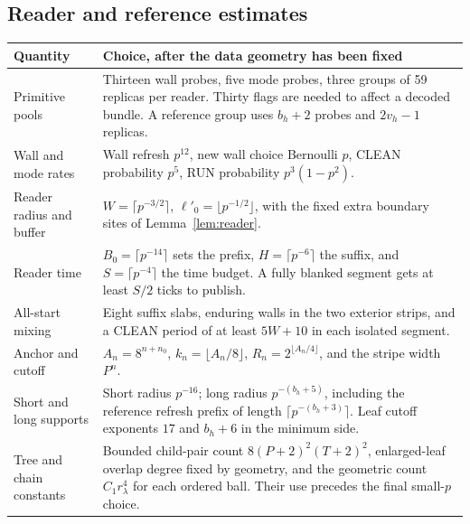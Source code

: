 \subsection{Reader and reference estimates}

\begin{longtable}{@{}>{\raggedright\arraybackslash}p{.29\linewidth}>{\raggedright\arraybackslash}p{.63\linewidth}@{}}
\toprule
Quantity & Choice, after the data geometry has been fixed \\
\midrule
\endhead
Primitive pools & Thirteen wall probes, five mode probes, three groups of 59 replicas per reader. Thirty flags are needed to affect a decoded bundle. A reference group uses \(b_h+2\) probes and \(2v_h-1\) replicas. \\
Wall and mode rates & Wall refresh \(p^{12}\), new wall choice Bernoulli \(p\), CLEAN probability \(p^5\), RUN probability \(p^3(1-p^2)\). \\
Reader radius and buffer & \(W=\lceil p^{-3/2}\rceil\), \(\ell'_0=\lfloor p^{-1/2}\rfloor\), with the fixed extra boundary sites of Lemma~\ref{lem:reader}. \\
Reader time & \(B_0=\lceil p^{-14}\rceil\) sets the prefix, \(H=\lceil p^{-6}\rceil\) the suffix, and \(S=\lceil p^{-4}\rceil\) the time budget. A fully blanked segment gets at least \(S/2\) ticks to publish. \\
All-start mixing & Eight suffix slabs, enduring walls in the two exterior strips, and a CLEAN period of at least \(5W+10\) in each isolated segment. \\
Anchor and cutoff & \(A_n=8^{n+n_0}\), \(k_n=\lfloor A_n/8\rfloor\), \(R_n=2^{\lfloor A_n/4\rfloor}\), and the stripe width \(P^n\). \\
Short and long supports & Short radius \(p^{-16}\); long radius \(p^{-(b_h+5)}\), including the reference refresh prefix of length \(\lceil p^{-(b_h+3)}\rceil\). Leaf cutoff exponents \(17\) and \(b_h+6\) in the minimum side. \\
Tree and chain constants & Bounded child-pair count \(8(P+2)^2(T+2)^2\), enlarged-leaf overlap degree fixed by geometry, and the geometric count \(C_1 r_\lambda^4\) for each ordered ball. Their use precedes the final small-\(p\) choice. \\
\bottomrule
\end{longtable}
